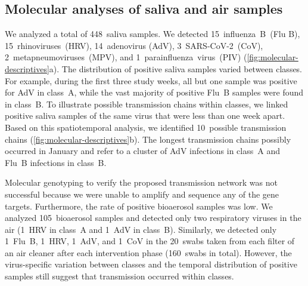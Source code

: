 \documentclass[fleqn,11pt]{wlscirep}
\begin{document}
\subsection{Molecular analyses of saliva and air samples}

We analyzed a total of 448~saliva samples. We detected 15~influenza~B~(Flu B), 15~rhinoviruses~(HRV), 14~adenovirus (AdV), 3~SARS-CoV-2~(CoV), 2~metapneumoviruses~(MPV), and 1~parainfluenza~virus~(PIV) (\cref{fig:molecular-descriptives}a). The distribution of positive saliva samples varied between classes. For example, during the first three study weeks, all but one sample was positive for AdV in class~A, while the vast majority of positive Flu~B samples were found in class~B. To illustrate possible transmission chains within classes, we linked positive saliva samples of the same virus that were less than one week apart. Based on this spatiotemporal analysis, we identified 10~possible transmission chains (\cref{fig:molecular-descriptives}b). The longest transmission chains possibly occurred in January and refer to a cluster of AdV infections in class~A and Flu~B infections in class~B. 

Molecular genotyping to verify the proposed transmission network was not successful because we were unable to amplify and sequence any of the gene targets. Furthermore, the rate of positive bioaerosol samples was low. We analyzed 105~bioaerosol samples and detected only two respiratory viruses in the air (1~HRV in class~A and 1~AdV in class~B). Similarly, we detected only 1~Flu~B, 1~HRV, 1~AdV, and 1~CoV in the 20~swabs taken from each filter of an air cleaner after each intervention phase (160~swabs in total). However, the virus-specific variation between classes and the temporal distribution of positive samples still suggest that transmission occurred within classes. 
\end{document}
